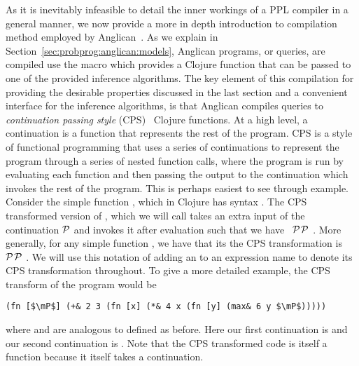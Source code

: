 As it is inevitably infeasible to detail the inner workings of a PPL compiler in a general
manner, we now provide a more in depth introduction to compilation method
employed by Anglican~\citep{tolpin2016design}.  As we explain in Section~\ref{sec:probprog:anglican:models},
Anglican programs, or queries, are compiled use the macro \query which provides a
Clojure function that can be passed to one of the provided inference algorithms.
The key element of this compilation for providing the desirable properties discussed
in the last section and a convenient interface for the inference algorithms, is that
Anglican compiles queries to \emph{continuation passing style} (CPS)~\citep{appel1989continuation}
Clojure functions.  At a high level, a continuation is a function that represents the rest of the
program.  CPS is a style of functional programming that uses a series of continuations
to represent the program through a series of nested function calls, where the program
is run by evaluating each function and then passing the output to the continuation
which invokes the rest of the program.  This is perhaps easiest to see through
example.  Consider the simple function \clj{+}, which in Clojure has syntax .  The
CPS transformed version of \clj{+}, which we will call \clj{+&} takes an extra input
of the continuation $\mathcal{P}$ and invokes it after evaluation such that we have
\clj{(defn +& [a b } ~$\mathcal{P}$\clj{] (}$\mathcal{P}$ .  More generally, for any simple function , we have
that its the CPS transformation is \clj{(defn f& [args} ~$\mathcal{P}$\clj{] (}$\mathcal{P}$ .  We 
will use this notation of adding an \clj{&} to an expression name to denote its CPS transformation throughout.
To give a more detailed example, the CPS transform of the program  would be
\begin{lstlisting}[basicstyle=\ttfamily\small,frame=none]
  (fn [$\mP$] (+& 2 3 (fn [x] (*& 4 x (fn [y] (max& 6 y $\mP$)))))
\end{lstlisting}\vspace{-8pt}
where \clj{*&} and
 are analogous to \clj{+&} defined as before.
Here our first continuation is  and our second continuation 
is .  Note that the CPS transformed code is itself a function because
it itself takes a continuation.  

